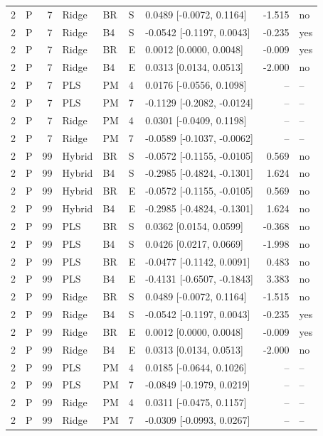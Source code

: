 \documentclass[10pt,a4paper]{article}
\begin{document}
\begin{longtable}{rlrllllrl}
2 & P & 7 & Ridge & BR & S & 0.0489 [-0.0072, 0.1164] & -1.515 & no \\
2 & P & 7 & Ridge & B4 & S & -0.0542 [-0.1197, 0.0043] & -0.235 & yes \\
2 & P & 7 & Ridge & BR & E & 0.0012 [0.0000, 0.0048] & -0.009 & yes \\
2 & P & 7 & Ridge & B4 & E & 0.0313 [0.0134, 0.0513] & -2.000 & no \\
2 & P & 7 & PLS & PM & 4 & 0.0176 [-0.0556, 0.1098] & -- & -- \\
2 & P & 7 & PLS & PM & 7 & -0.1129 [-0.2082, -0.0124] & -- & -- \\
2 & P & 7 & Ridge & PM & 4 & 0.0301 [-0.0409, 0.1198] & -- & -- \\
2 & P & 7 & Ridge & PM & 7 & -0.0589 [-0.1037, -0.0062] & -- & -- \\
2 & P & 99 & Hybrid & BR & S & -0.0572 [-0.1155, -0.0105] & 0.569 & no \\
2 & P & 99 & Hybrid & B4 & S & -0.2985 [-0.4824, -0.1301] & 1.624 & no \\
2 & P & 99 & Hybrid & BR & E & -0.0572 [-0.1155, -0.0105] & 0.569 & no \\
2 & P & 99 & Hybrid & B4 & E & -0.2985 [-0.4824, -0.1301] & 1.624 & no \\
2 & P & 99 & PLS & BR & S & 0.0362 [0.0154, 0.0599] & -0.368 & no \\
2 & P & 99 & PLS & B4 & S & 0.0426 [0.0217, 0.0669] & -1.998 & no \\
2 & P & 99 & PLS & BR & E & -0.0477 [-0.1142, 0.0091] & 0.483 & no \\
2 & P & 99 & PLS & B4 & E & -0.4131 [-0.6507, -0.1843] & 3.383 & no \\
2 & P & 99 & Ridge & BR & S & 0.0489 [-0.0072, 0.1164] & -1.515 & no \\
2 & P & 99 & Ridge & B4 & S & -0.0542 [-0.1197, 0.0043] & -0.235 & yes \\
2 & P & 99 & Ridge & BR & E & 0.0012 [0.0000, 0.0048] & -0.009 & yes \\
2 & P & 99 & Ridge & B4 & E & 0.0313 [0.0134, 0.0513] & -2.000 & no \\
2 & P & 99 & PLS & PM & 4 & 0.0185 [-0.0644, 0.1026] & -- & -- \\
2 & P & 99 & PLS & PM & 7 & -0.0849 [-0.1979, 0.0219] & -- & -- \\
2 & P & 99 & Ridge & PM & 4 & 0.0311 [-0.0475, 0.1157] & -- & -- \\
2 & P & 99 & Ridge & PM & 7 & -0.0309 [-0.0993, 0.0267] & -- & -- \\

\end{longtable}
\end{document}
